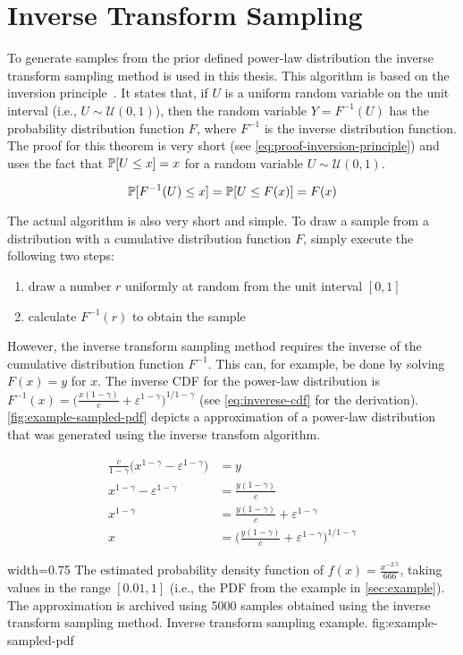 \section{Inverse Transform Sampling}
\label{sec:inverse-transform-sampling}

To generate samples from the prior defined power-law distribution the inverse transform sampling method is used in this thesis.
This algorithm is based on the inversion principle~\cite{Devroye1986}.
It states that, if \(U\) is a uniform random variable on the unit interval (i.e., \(U \sim \mathcal{U}(0,1)\)), then the random variable \(Y = F^{-1}(U)\) has the probability distribution function \(F\), where \(F^{-1}\) is the inverse distribution function.
The proof for this theorem is very short (see \autoref{eq:proof-inversion-principle}) and uses the fact that \(\mathbb{P}[{U \leq x}] = x\) for a random variable \(U \sim \mathcal{U}(0,1)\).

\begin{equation}
    \mathbb{P}[{F^{-1}(U) \leq x}] = \mathbb{P}[{U \leq F(x)}] = F(x)
    \label{eq:proof-inversion-principle}
\end{equation}

The actual algorithm is also very short and simple.
To draw a sample from a distribution with a cumulative distribution function \(F\), simply execute the following two steps:

\begin{enumerate}
    \item draw a number \(r\) uniformly at random from the unit interval \([0, 1]\)
    \item calculate \(F^{-1}(r)\) to obtain the sample
\end{enumerate}

However, the inverse transform sampling method requires the inverse of the cumulative distribution function \(F^{-1}\).
This can, for example, be done by solving \(F(x) = y\) for \(x\).
The inverse CDF for the power-law distribution is \(F^{-1}(x) = \Big( \frac{x(1-\gamma)}{c} + \varepsilon^{1-\gamma} \Big)^{1/1-\gamma}\) (see \autoref{eq:inverese-cdf} for the derivation).
\autoref{fig:example-sampled-pdf} depicts a approximation of a power-law distribution that was generated using the inverse transfom algorithm.

\begin{align}
	\frac{c}{1-\gamma} \Big( x^{1 - \gamma} - \varepsilon^{1 - \gamma} \Big) & = y \\
    x^{1-\gamma} - \varepsilon^{1-\gamma} & = \frac{y(1-\gamma)}{c} \\
    x^{1-\gamma} & = \frac{y(1-\gamma)}{c} + \varepsilon^{1-\gamma} \\
    x & = \Big( \frac{y(1-\gamma)}{c} + \varepsilon^{1-\gamma} \Big)^{1/1-\gamma}
\label{eq:inverese-cdf}
\end{align}

      {width=0.75\textwidth}
      {The estimated probability density function of \(f(x) = \frac{x^{-2.5}}{666}\), taking values in the range \([0.01, 1]\) (i.e., the PDF from the example in \autoref{sec:example}). The approximation is archived using 5000 samples obtained using the inverse transform sampling method.}
      {Inverse transform sampling example.}
      {fig:example-sampled-pdf}
